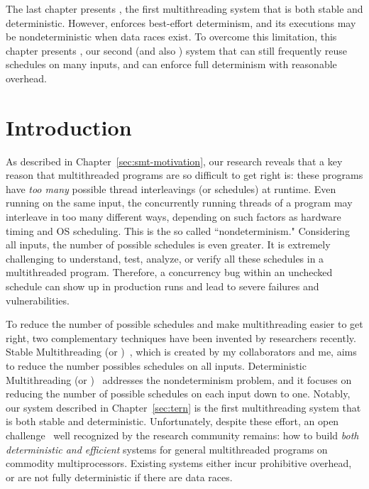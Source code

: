 The last chapter presents \tern, the first multithreading system that is both 
stable and deterministic. However, \tern enforces best-effort determinism, and 
its executions may be nondeterministic when data races exist. To overcome this 
limitation, this chapter presents \peregrine, our second \smt (and also \dmt) 
system that can still frequently reuse schedules on many inputs, and can 
enforce full determinism with reasonable overhead.

\section{Introduction} \label{sec:peregrine-intro}

As described in Chapter~\ref{sec:smt-motivation}, our research reveals that a
key reason that multithreaded programs are so difficult to get right is: these
programs have \emph{too many} possible thread interleavings (or schedules) at
runtime. Even running on the same input, the concurrently running threads of a
program may interleave in too many different ways, depending on such factors as
hardware timing and OS scheduling. This is the so called ``nondeterminism."
Considering all inputs, the number of possible schedules is even greater. It is
extremely challenging to understand, test, analyze, or verify all
these schedules in a multithreaded program. Therefore, a concurrency bug within
an unchecked schedule can show up in production runs and lead to severe
failures and vulnerabilities.

To reduce the number of possible schedules and make multithreading easier to get
right, two complementary techniques have been invented by researchers recently.
Stable Multithreading (or \smt)~\cite{determinator:osdi10, cui:tern:osdi10}, 
which is created by my collaborators and me, aims to reduce the number possibles
schedules on all inputs. Deterministic Multithreading
(or \dmt)~\cite{dmp:asplos09,kendo:asplos09,coredet:asplos10,
dos:osdi10,grace:oopsla09} addresses the nondeterminism problem, and it focuses
on reducing the number of possible schedules on each input down to one. Notably,
our \tern system described in Chapter~\ref{sec:tern} is the first 
multithreading system that is both stable and deterministic. Unfortunately, 
despite these effort, an open challenge~\cite{wodet11}
well recognized by the research community remains: how to build \emph{both
deterministic and efficient} \dmt systems for general multithreaded programs on
commodity multiprocessors.  Existing \dmt systems either incur prohibitive
overhead, or are not fully deterministic if there are data races.

